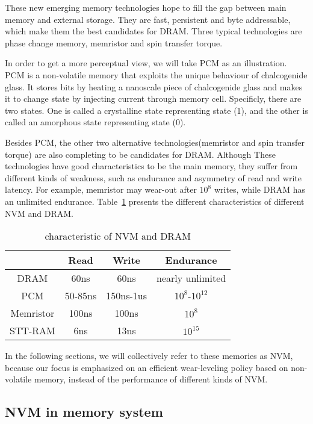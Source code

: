 \documentclass[10pt, conference, compsocconf]{IEEEtran}
\begin{document}
These new emerging memory technologies hope to fill the gap between main memory and external storage.
They are fast, persistent and byte addressable, which make them the best candidates for DRAM.
Three typical technologies are phase change memory, memristor and spin transfer torque.

In order to get a more perceptual view, we will take PCM as an illustration. 
PCM is a non-volatile memory that exploits the unique behaviour of chalcogenide glass.
It stores bits by heating a nanoscale piece of chalcogenide glass and makes it to change state by injecting current through memory cell.
Specificly, there are two states.
One is called a crystalline state representing state (1), and the other is called an amorphous state representing state (0).

Besides PCM, the other two alternative technologies(memristor and spin transfer torque) are also completing to be candidates for DRAM.
Although These technologies have good characteristics to be the main memory,
they suffer from different kinds of weakness, such as endurance and asymmetry of read and write latency. 
For example, memristor may wear-out after $10^8$ writes, while DRAM has an unlimited endurance.
Table~\ref{tab:NVMvsDRAM} presents the different characteristics of different NVM and DRAM.

\begin{table}[h]
    \centering
    \begin{tabular}{|c|c|c|c|} \hline
        & Read & Write & Endurance\\ \hline
        DRAM & 60ns & 60ns & nearly unlimited\\ \hline
        PCM & 50-85ns & 150ns-1us & $10^8$-$10^{12}$\\ \hline
        Memristor & 100ns & 100ns & $10^8$\\ \hline
        STT-RAM & 6ns & 13ns & $10^{15}$\\ \hline
    \end{tabular}
    \caption{characteristic of NVM and DRAM}
\label{tab:NVMvsDRAM}
\end{table}

In the following sections, we will collectively refer to these memories as NVM, 
because our focus is emphasized on an efficient wear-leveling policy based on non-volatile memory,
instead of the performance of different kinds of NVM.

\subsection{NVM in memory system}
\end{document}
